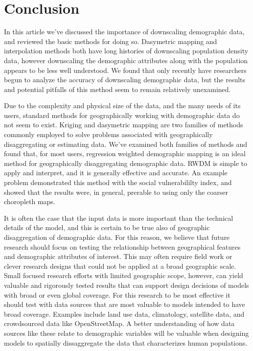 \documentclass[draft]{article}
\begin{document}



\section{Conclusion}

In this article we've discussed the importance of downscaling demographic data, and reviewed the basic methods for doing so.  Dasymetric mapping and interpolation methods both have long histories of downscaling population density data, however downscaling the demographic attributes along with the population appears to be less well understood.  We found that only recently have researchers begun to analyze the accuracy of downscaling demographic data, but the results and potential pitfalls of this method seem to remain relatively unexamined.

Due to the complexity and physical size of the data, and the many needs of its users, standard methods for geographically working with demographic data do not seem to exist.  Kriging and dasymetric mapping are two families of methods commonly employed to solve problems associated with geographically disaggregating or estimating data.  We've examined both families of methods and found that, for most users, regression weighted demographic mapping is an ideal method for geographically disaggregating demographic data.  RWDM is simple to apply and interpret, and it is generally effective and accurate.  An example problem demonstrated this method with the social vulnerabililty index, and showed that the results were, in general, prerable to using only the coarser choropleth maps.

It is often the case that the input data is more important than the technical details of the model, and this is certain to be true also of geographic disaggregation of demographic data.  For this reason, we believe that future research should focus on testing the relationship between geographical features and demographic attributes of interest.  This may often require field work or clever research designs that could not be applied at a broad geographic scale.  Small focused research efforts with limited geographic scope, however, can yield valuable and rigorously tested results that can support design decisions of models with broad or even global coverage.  For this research to be most effective it should test with data sources that are most valuable to models intended to have broad coverage.  Examples include land use data, climatology, satellite data, and crowdsourced data like OpenStreetMap.  A better understanding of how data sources like these relate to demographic variables will be valuable when designing models to spatially dissaggregate the data that characterizes human populations.



\end{document}
